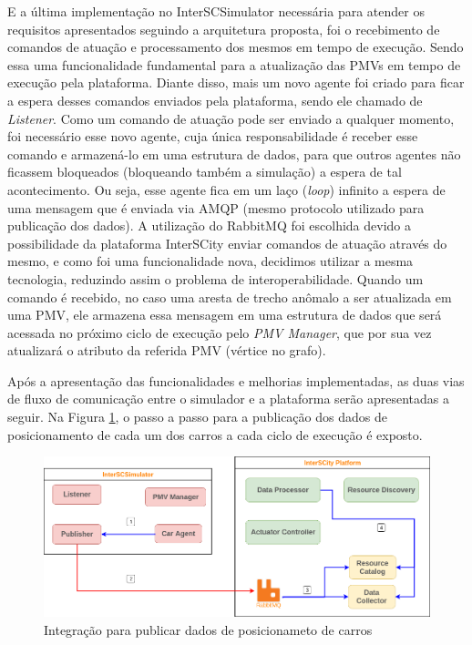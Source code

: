 E a última implementação no InterSCSimulator necessária para atender os requisitos apresentados seguindo a arquitetura proposta, foi o recebimento de comandos de atuação e
processamento dos mesmos em tempo de execução.
Sendo essa uma funcionalidade fundamental para a atualização das PMVs em tempo de execução pela plataforma.
Diante disso, mais um novo agente foi criado para ficar a espera desses comandos enviados pela plataforma, sendo ele chamado de \textit{Listener}.
Como um comando de atuação pode ser enviado a qualquer momento, foi necessário esse novo agente, cuja única responsabilidade é receber esse comando e armazená-lo em uma
estrutura de dados, para que outros agentes não ficassem bloqueados (bloqueando também a simulação) a espera de tal acontecimento.
Ou seja, esse agente fica em um laço (\textit{loop}) infinito a espera de uma mensagem que é enviada via AMQP (mesmo protocolo utilizado para publicação dos dados).
A utilização do RabbitMQ foi escolhida devido a possibilidade da plataforma InterSCity enviar comandos de atuação através do mesmo, e como foi uma funcionalidade nova,
decidimos utilizar a mesma tecnologia, reduzindo assim o problema de interoperabilidade.
Quando um comando é recebido, no caso uma aresta de trecho anômalo a ser atualizada em uma PMV, ele armazena essa mensagem em uma estrutura de dados que será acessada no
próximo ciclo de execução pelo \textit{PMV Manager}, que por sua vez atualizará o atributo da referida PMV (vértice no grafo).

Após a apresentação das funcionalidades e melhorias implementadas, as duas vias de fluxo de comunicação entre o simulador e a plataforma serão apresentadas a seguir.
Na Figura \ref{fig:smart_traffic_publish_data}, o passo a passo para a publicação dos dados de posicionamento de cada um dos carros a cada ciclo de execução é exposto.

\begin{figure}[ht]
	\centering
	\includegraphics[width=\textwidth]{figuras/integration-publish-car-position.png}
	\caption{Integração para publicar dados de posicionameto de carros}
	\label{fig:smart_traffic_publish_data}
\end{figure}

